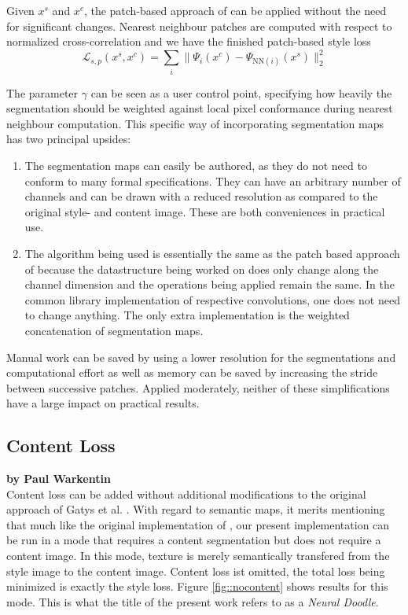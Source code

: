 Given \(x^s\) and \(x^c\), the patch-based approach of \cite{mrf2016} can be applied without the need for significant changes. Nearest neighbour patches are computed with respect to normalized cross-correlation and we have the finished patch-based style loss
\[\mathcal{L}_{s,p}(x^s,x^c) = \sum_i \|\Psi_i(x^c)-\Psi_{\text{NN}(i)}(x^s)\|_2^2\]

The parameter \(\gamma\) can be seen as a user control point, specifying how heavily the segmentation should be weighted against local pixel conformance during nearest neighbour computation. This specific way of incorporating segmentation maps has two principal upsides:
\begin{enumerate}
	\item The segmentation maps can easily be authored, as they do not need to conform to many formal specifications. They can have an arbitrary number of channels and can be drawn with a reduced resolution as compared to the original style- and content image. These are both conveniences in practical use.
	\item The algorithm being used is essentially the same as the patch based approach of \cite{mrf2016} because the datastructure being worked on does only change along the channel dimension and the operations being applied remain the same. In the common library implementation of respective convolutions, one does not need to change anything. The only extra implementation is the weighted concatenation of segmentation maps.
\end{enumerate}

Manual work can be saved by using a lower resolution for the segmentations and computational effort as well as memory can be saved by increasing the stride between successive patches. Applied moderately, neither of these simplifications have a large impact on practical results.

\subsection{Content Loss}

\textbf{by Paul Warkentin} \\

Content loss can be added without additional modifications to the original approach of Gatys et al. \cite{gatys2015neural}. With regard to semantic maps, it merits mentioning that much like the original implementation of \cite{doodles2016}, our present implementation can be run in a mode that requires a content segmentation but does not require a content image. In this mode, texture is merely semantically transfered from the style image to the content image. Content loss ist omitted, the total loss being minimized is exactly the style loss. Figure \ref{fig::nocontent} shows results for this mode. This is what the title of the present work refers to as a \emph{Neural Doodle}.

